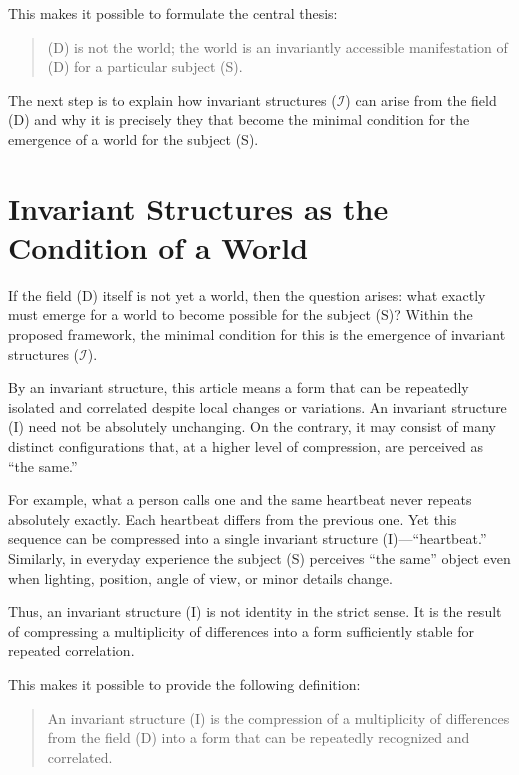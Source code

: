 \documentclass[aps,prd,onecolumn,nofootinbib,superscriptaddress]{revtex4-2} %
\begin{document}
    This makes it possible to formulate the central thesis:

    \begin{quote}
        (D) is not the world; the world is an invariantly accessible manifestation of (D) for a particular subject (S).
    \end{quote}

    The next step is to explain how invariant structures ($\mathcal{I}$) can arise from the field (D) and why it is precisely they that become the minimal condition for the emergence of a world for the subject (S).


    \section{Invariant Structures as the Condition of a World}
    If the field (D) itself is not yet a world, then the question arises: what exactly must emerge for a world to become possible for the subject (S)? Within the proposed framework, the minimal condition for this is the emergence of invariant structures ($\mathcal{I}$).

    By an invariant structure, this article means a form that can be repeatedly isolated and correlated despite local changes or variations. An invariant structure (I) need not be absolutely unchanging. On the contrary, it may consist of many distinct configurations that, at a higher level of compression, are perceived as “the same.”

    For example, what a person calls one and the same heartbeat never repeats absolutely exactly. Each heartbeat differs from the previous one. Yet this sequence can be compressed into a single invariant structure (I)—“heartbeat.” Similarly, in everyday experience the subject (S) perceives “the same” object even when lighting, position, angle of view, or minor details change.

    Thus, an invariant structure (I) is not identity in the strict sense. It is the result of compressing a multiplicity of differences into a form sufficiently stable for repeated correlation.

    This makes it possible to provide the following definition:

    \begin{quote}
        An invariant structure (I) is the compression of a multiplicity of differences from the field (D) into a form that can be repeatedly recognized and correlated.
    \end{quote}
\end{document}
